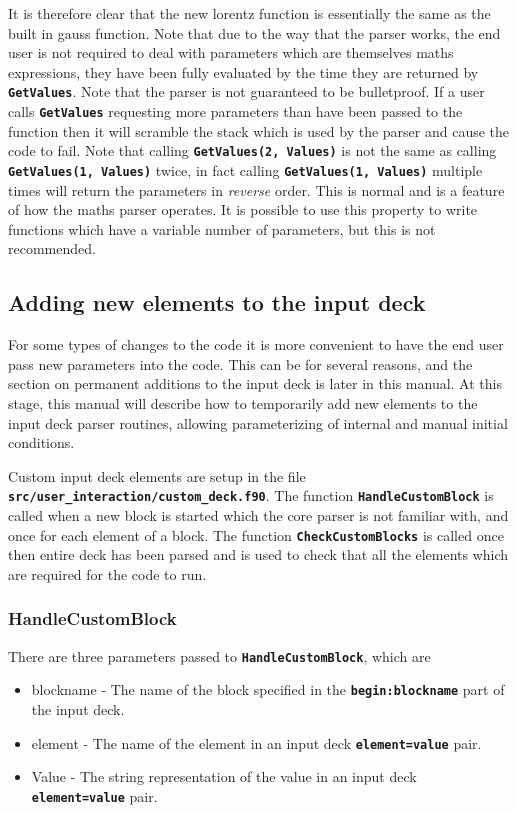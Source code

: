 \documentclass[12pt,a4paper]{article}
\newcommand{\inlinecode}[1]{{\color{warwickred} \bf\texttt{#1}}}
\begin{document}
It is therefore clear that the new lorentz function is essentially the same as
the built in gauss function. Note that due to the way that the parser works,
the end user is not required to deal with parameters which are themselves
maths expressions, they have been fully evaluated by the time they are
returned by \inlinecode{GetValues}. Note that the parser is not guaranteed to
be bulletproof. If a user calls \inlinecode{GetValues} requesting more
parameters than have been passed to the function then it will scramble the
stack which is used by the parser and cause the code to fail. Note that
calling \inlinecode{GetValues(2, Values)} is not the same as calling
\inlinecode{GetValues(1, Values)} twice, in fact calling
\inlinecode{GetValues(1, Values)} multiple times will return the parameters in
{\it reverse} order. This is normal and is a feature of how the maths parser
operates. It is possible to use this property to write functions which have a
variable number of parameters, but this is not recommended.

\subsection{Adding new elements to the input deck}

For some types of changes to the code it is more convenient to have the end
user pass new parameters into the code. This can be for several reasons, and
the section on permanent additions to the input deck is later in this
manual. At this stage, this manual will describe how to temporarily add new
elements to the input deck parser routines, allowing parameterizing of
internal and manual initial conditions.

Custom input deck elements are setup in the file
\inlinecode{src/user\_interaction/custom\_deck.f90}. The function
\inlinecode{HandleCustomBlock} is called when a new block is started which the
core parser is not familiar with, and once for each element of a block. The
function \inlinecode{CheckCustomBlocks} is called once then entire deck has
been parsed and is used to check that all the elements which are required for
the code to run.

\subsubsection{HandleCustomBlock}
There are three parameters passed to \inlinecode{HandleCustomBlock}, which are
\begin{itemize}
\item blockname - The name of the block specified in the
  \inlinecode{begin:blockname} part of the input deck.
\item element - The name of the element in an input deck
  \inlinecode{element=value} pair.
\item Value - The string representation of the value in an input deck
  \inlinecode{element=value} pair.
\end{itemize}
\end{document}
